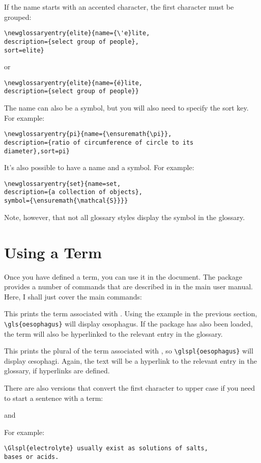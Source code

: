 \documentclass{nlctdoc}
\begin{document}
If the name starts with an accented character, the first character
must be grouped:
\begin{verbatim}
\newglossaryentry{elite}{name={\'e}lite,
description={select group of people},
sort=elite}
\end{verbatim}
or
\begin{verbatim}
\newglossaryentry{elite}{name={é}lite,
description={select group of people}}
\end{verbatim}

The name can also be a symbol, but you will also need to specify
the sort key. For example:
\begin{verbatim}
\newglossaryentry{pi}{name={\ensuremath{\pi}},
description={ratio of circumference of circle to its 
diameter},sort=pi}
\end{verbatim}
It's also possible to have a name and a symbol. For example:
\begin{verbatim}
\newglossaryentry{set}{name=set,
description={a collection of objects},
symbol={\ensuremath{\mathcal{S}}}}
\end{verbatim}
Note, however, that not all glossary styles display the symbol
in the glossary.

\section{Using a Term}
\label{usingterm}

Once you have defined a term, you can use it in the document. The
 package provides a number of commands that are
described in  in the main  user manual.
Here, I shall just cover the main commands:
\begin{definition}
\end{definition}
This prints the term associated with . Using the
example in the previous section, \verb|\gls{oesophagus}|
will display \oe sophagus. If the  package has also
been loaded, the term will also be hyperlinked to the relevant
entry in the glossary.
\begin{definition}
\end{definition}
This prints the plural of the term associated with ,
so \verb|\glspl{oesophagus}| will display \oe sophagi. Again, the
text will be a hyperlink to the relevant entry in the glossary, if
hyperlinks are defined.

There are also versions that convert the first character to upper
case if you need to start a sentence with a term:
\begin{definition}
\end{definition}
and
\begin{definition}
\end{definition}
For example:
\begin{verbatim}
\Glspl{electrolyte} usually exist as solutions of salts, 
bases or acids.
\end{verbatim}
\end{document}
